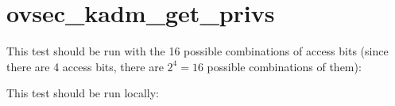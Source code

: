 


\section{ovsec_kadm_get_privs}


This test should be run with the 16 possible combinations of access
bits (since there are 4 access bits, there are $2^4 = 16$ possible
combinations of them):


This test should be run locally:



